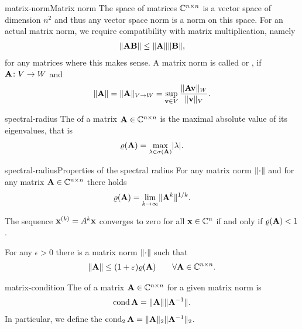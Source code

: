 \begin{Definition*}{matrix-norm}{Matrix norm}
  The space of matrices $\mathbb C^{n\times n}$ is a vector space of dimension $n^2$ and thus any vector space norm is a norm on this space. For an actual matrix norm, we require compatibility with matrix multiplication, namely
  \begin{gather}
    \lVert\mathbf A\mathbf B\rVert \le \lVert\mathbf A\rVert\lVert\mathbf B\rVert,
  \end{gather}
  for any matrices where this makes sense. A matrix norm is called  or , if $\mathbf A\colon V\to W$ and
  \begin{gather}
    \lVert\mathbf A\rVert = \lVert\mathbf A\rVert_{V\to W} = \sup_{\mathbf v\in V}\frac{\lVert\mathbf A\mathbf v\rVert_W}{\lVert\mathbf v\rVert_V}.
  \end{gather}
\end{Definition*}

\begin{Definition}{spectral-radius}
  The  of a matrix $\mathbf A\in\mathbb C^{n\times n}$ is the
  maximal absolute value of its eigenvalues, that is
  \begin{gather}
    \varrho(\mathbf A) = \max_{\lambda\in\sigma(\mathbf A)} \lvert\lambda\rvert.
  \end{gather}
\end{Definition}

\begin{Lemma*}{spectral-radius}{Properties of the spectral radius}
  For any matrix norm $\lVert\cdot\rVert$ and for any matrix $\mathbf A\in\mathbb C^{n\times n}$ there holds
  \begin{gather}
    \varrho(\mathbf A) = \lim_{k\to\infty} \lVert\mathbf A^k\rVert^{1/k}.
  \end{gather}

  The sequence $\mathbf x^{(k)} = A^k\mathbf x$ converges to zero for all
  $\mathbf x\in\mathbb C^n$ if and only if $\varrho(\mathbf A)<1$.

  For any $\epsilon>0$
  there is a matrix norm $\lVert\cdot\rVert$ such that
  \begin{gather}
    \lVert\mathbf A\rVert \le (1+\varepsilon) \varrho(\mathbf A) \qquad \forall \mathbf A\in\mathbb C^{n\times n}.
  \end{gather}
\end{Lemma*}

\begin{Definition}{matrix-condition}
  The  of a matrix $\mathbf A\in\mathbb C^{n\times n}$ for a given
  matrix norm is
  \begin{gather*}
    \operatorname{cond}\mathbf A = \lVert\mathbf A\rVert\lVert\mathbf A^{-1}\rVert.
  \end{gather*}
  In particular, we define the 
 $\operatorname{cond}_2\mathbf A = \lVert\mathbf A\rVert_2\lVert\mathbf A^{-1}\rVert_2$.
\end{Definition}


